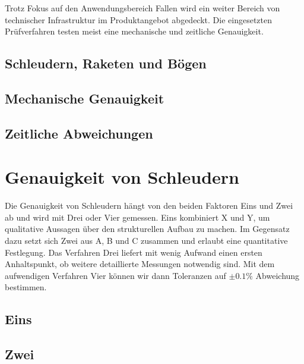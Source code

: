 \documentclass[11pt,a4paper]{report}
\begin{document}
Trotz Fokus auf den Anwendungsbereich Fallen wird ein weiter Bereich
von technischer Infrastruktur im Produktangebot abgedeckt.
Die eingesetzten Prüfverfahren testen meist eine mechanische
und zeitliche Genauigkeit.

\section{Schleudern, Raketen und Bögen} \label{sec:was}

\blindtext[2]
\blindtext[2]

\section{Mechanische Genauigkeit} \label{sec:mec}

\blindtext[2]
\blindtext[1]
\blindtext[2]

\section{Zeitliche Abweichungen} \label{sec:time}

\blindtext[1]
\blindtext[2]
\blindtext[1]

\chapter{Genauigkeit von Schleudern} \label{chap:sling}

Die Genauigkeit von Schleudern hängt von den beiden Faktoren
Eins und Zwei ab und wird mit Drei oder Vier gemessen.
Eins kombiniert X und Y, um qualitative Aussagen über den
strukturellen Aufbau zu machen.
Im Gegensatz dazu setzt sich Zwei aus A, B und C zusammen
und erlaubt eine quantitative Festlegung.
Das Verfahren Drei liefert mit wenig Aufwand einen ersten
Anhaltspunkt, ob weitere detaillierte Messungen notwendig sind.
Mit dem aufwendigen Verfahren Vier können wir dann Toleranzen
auf $\pm 0.1\%$ Abweichung bestimmen.

\section{Eins}

\blindtext[3]
\blindtext[1]
\blindtext[2]
\blindtext[3]

\section{Zwei}
\end{document}
